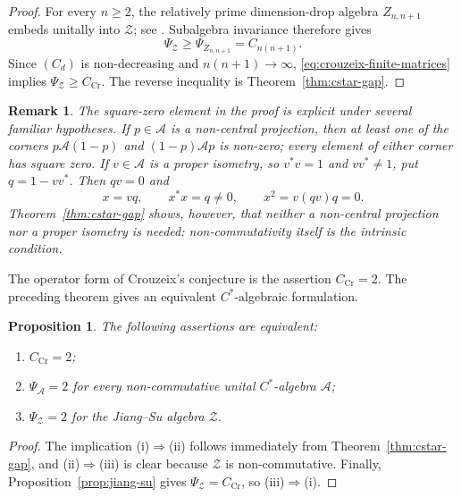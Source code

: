\documentclass[10pt,a4paper]{amsart}
\newtheorem{proposition}[theorem]{Proposition}
\newtheorem{remark}[theorem]{Remark}
\newcommand{\calA}{\mathcal A}
\begin{document}
\begin{proof}
For every \(n\geqslant2\), the relatively prime dimension-drop algebra
\(Z_{n,n+1}\) embeds unitally into \(\mathcal Z\); see
\cite[Proposition~3.3]{RordamWinter}.  Subalgebra invariance therefore gives
\[
       \Psi_{\mathcal Z}\geqslant\Psi_{Z_{n,n+1}}
       =C_{n(n+1)}.
\]
Since \((C_d)\) is non-decreasing and \(n(n+1)\to\infty\),
\eqref{eq:crouzeix-finite-matrices} implies
\(\Psi_{\mathcal Z}\geqslant C_{\mathrm{Cr}}\).  The reverse inequality is
Theorem~\ref{thm:cstar-gap}.
\end{proof}

\begin{remark}\label{rem:cstar-square-zero}
The square-zero element in the proof is explicit under several familiar
hypotheses.  If \(p\in\calA\) is a non-central projection, then at least one of
the corners \(p\calA(1-p)\) and \((1-p)\calA p\) is non-zero; every element
of either corner has square zero.  If \(v\in\calA\) is a proper isometry, so
\(v^*v=1\) and \(vv^*\neq1\), put \(q=1-vv^*\).  Then \(qv=0\) and
\[
       x=vq,
       \qquad
       x^*x=q\neq0,
       \qquad
       x^2=v(qv)q=0.
\]
Theorem~\ref{thm:cstar-gap} shows, however, that neither a non-central
projection nor a proper isometry is needed: non-commutativity itself is the
intrinsic condition.
\end{remark}

The operator form of Crouzeix's conjecture is the assertion
\(C_{\mathrm{Cr}}=2\).  The preceding theorem gives an equivalent
\(C^*\)-algebraic formulation.

\begin{proposition}\label{prop:cstar-crouzeix}
The following assertions are equivalent:
\begin{enumerate}
\item[(i)] \(C_{\mathrm{Cr}}=2\);
\item[(ii)] \(\Psi_{\calA}=2\) for every non-commutative unital
      \(C^*\)-algebra \(\calA\);
\item[(iii)] \(\Psi_{\mathcal Z}=2\) for the Jiang--Su algebra \(\mathcal Z\).
\end{enumerate}
\end{proposition}

\begin{proof}
The implication \textup{(i)}\(\Rightarrow\)\textup{(ii)} follows immediately
from Theorem~\ref{thm:cstar-gap}, and \textup{(ii)}\(\Rightarrow\)\textup{(iii)}
is clear because \(\mathcal Z\) is non-commutative.  Finally,
Proposition~\ref{prop:jiang-su} gives
\(\Psi_{\mathcal Z}=C_{\mathrm{Cr}}\), so
\textup{(iii)}\(\Rightarrow\)\textup{(i)}.
\end{proof}
\end{document}
